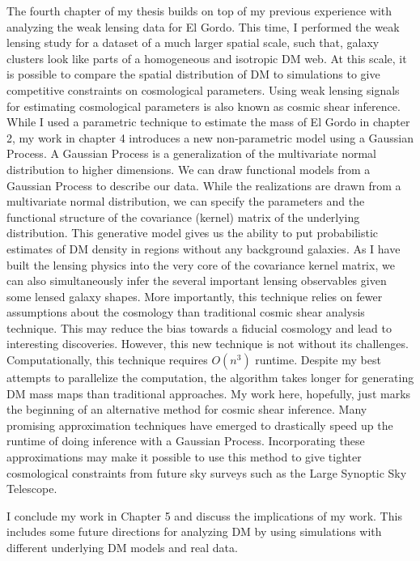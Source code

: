 \documentclass[ucdthesis.tex]{subfiles}
\begin{document}
			The fourth chapter of my thesis builds on top of my previous experience
			with analyzing the weak lensing data for El Gordo. This time, I performed 
			the weak lensing study for a dataset of a much larger spatial scale, 
			such that, galaxy
		clusters look like parts of a homogeneous and isotropic DM web. At this scale,
		it is possible to compare the spatial distribution of DM to simulations to give 
		competitive constraints on cosmological parameters. Using weak lensing
		signals for estimating cosmological parameters is also known as cosmic shear 
		inference. While I used a parametric technique to estimate the mass of El
		Gordo in chapter 2, 
		my work in chapter 4 introduces a new non-parametric model using a Gaussian Process.
		A Gaussian Process is a generalization of the multivariate normal distribution 
		to higher dimensions. We can draw functional models from a Gaussian Process
		to describe our data. While the realizations are drawn from a multivariate
		normal distribution,  we can specify the parameters and the
		functional structure of the covariance (kernel) matrix of the underlying 
		distribution. 
		This generative model gives us the ability to put probabilistic estimates 
		of DM density in regions without any background galaxies. 
		As I have built the lensing physics into the 
		very core of the covariance kernel matrix, we can also simultaneously infer the
		several important lensing observables given some lensed galaxy shapes. 
		More importantly, this technique relies on fewer assumptions about the
		cosmology than traditional cosmic shear analysis technique. This may reduce
		the bias towards a fiducial cosmology and lead to interesting discoveries.
		However, this new technique is not without its challenges. Computationally,
		this technique requires $O(n^3)$ runtime. Despite my best attempts to
		parallelize the computation, the algorithm takes longer for
	  generating DM mass maps than traditional approaches. My work here,
		hopefully, just marks the beginning of an alternative method for cosmic
		shear inference. Many promising approximation techniques have emerged to 
		drastically speed up the runtime of doing inference with a Gaussian Process.
		Incorporating these approximations may make it possible to use this method 
		to give tighter cosmological constraints  
		from future sky surveys such as the Large Synoptic Sky Telescope.  

			I conclude my work in Chapter 5 and discuss the implications of my work.
			This includes some future directions for analyzing DM
			by using simulations with different underlying DM
			models and real data. 
\end{document}
